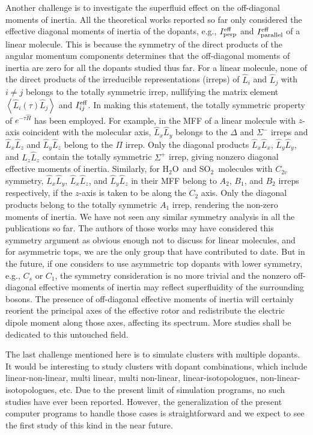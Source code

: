 \documentclass[12pt]{iopart}
\newcommand{\water}{H$_2$O}
\newcommand{\sotwo}{SO$_2$}
\begin{document}
Another challenge is to investigate the superfluid effect on the off-diagonal moments of inertia. All the theoretical works reported so far only considered the effective diagonal moments of inertia of the dopants, e.g., $I^{\rm eff}_{\rm perp}$ and $I^{\rm eff}_{\rm parallel}$ of a linear molecule. This is because the symmetry of the direct products of the angular momentum components determines that the off-diagonal moments of inertia are zero for all the dopants studied thus far. For a linear molecule, none of the direct products of the irreducible representations (irreps) of $\hat{L}_i$ and $\hat{L}_j$ with $i\ne j$ belongs to the totally symmetric irrep, nullifying the matrix element $\left<\hat{L}_i\left(\tau \right)\hat{L}_j \right>$ and $I^{\rm eff}_{ij}$. In making this statement, the totally symmetric property of
$e^{-\tau \hat{H} }$
has been employed. For example, in the MFF of a linear molecule with $z$-axis coincident with the molecular axis, $\hat{L}_x\hat{L}_y$ belongs to the $\Delta$ and $\Sigma^-$ irreps and $\hat{L}_x\hat{L}_z$ and $\hat{L}_y\hat{L}_z$ belong to the $\Pi$ irrep. Only the diagonal products $\hat{L}_x\hat{L}_x$, $\hat{L}_y\hat{L}_y$, and $\hat{L}_z\hat{L}_z$ contain the totally symmetric $\Sigma^+$ irrep, giving nonzero diagonal effective moments of inertia. Similarly, for \water~and \sotwo~molecules with $C_{2v}$ symmetry, $\hat{L}_x\hat{L}_y$, $\hat{L}_x\hat{L}_z$, and $\hat{L}_y\hat{L}_z$ in their MFF belong to $A_2$, $B_1$, and $B_2$ irreps respectively, if the $z$-axis is taken to be along the $C_2$ axis. Only the diagonal products belong to the totally symmetric $A_1$ irrep, rendering the non-zero moments of inertia. We have not seen any similar symmetry analysis in all the publications so far. 
The authors of those works may have considered this symmetry argument as obvious enough not to discuss for linear molecules, and for asymmetric tops, we are the only group that have contributed to date. But in the future, if one considers to use asymmetric top dopants with lower symmetry, e.g., $C_s$ or $C_1$, the symmetry consideration is no more trivial and the nonzero off-diagonal effective moments of inertia may reflect superfluidity of the surrounding bosons. The presence of off-diagonal effective moments of inertia will certainly reorient the principal axes of the effective rotor and redistribute the electric dipole moment along those axes, affecting its spectrum. More studies shall be dedicated to this untouched field.

The last challenge mentioned here is to simulate clusters with multiple dopants. It would be interesting to study clusters with dopant combinations, which include linear-non-linear, multi linear, multi non-linear, linear-isotopologues, non-linear-isotopologues, etc. 
Due to the present limit of simulation programs, no such studies have ever been reported. 
However, the generalization of the present computer programs to handle those cases is straightforward and we expect to see the first study of this kind in the near future.
\end{document}
